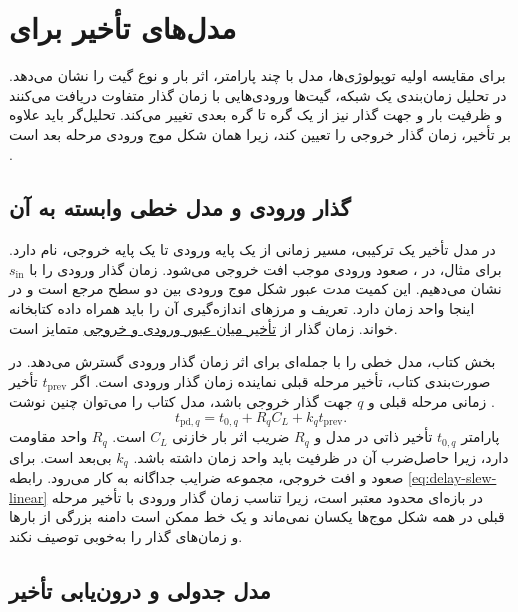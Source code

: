 \section{مدل‌های تأخیر برای }
\label{sec:delay-timing-models}

برای مقایسه اولیه توپولوژی‌ها، مدل 
با چند پارامتر، اثر بار و نوع گیت را نشان می‌دهد. در تحلیل
زمان‌بندی یک شبکه، گیت‌ها ورودی‌هایی با زمان گذار متفاوت
دریافت می‌کنند و ظرفیت بار و جهت گذار نیز از یک گره تا گره
بعدی تغییر می‌کند. تحلیل‌گر باید علاوه بر تأخیر، زمان گذار
خروجی را تعیین کند، زیرا همان شکل موج ورودی مرحله بعد است
\cite[بخش ، صفحات ۱۷۳ و ۱۷۴]{weste}.

\subsection{گذار ورودی و مدل خطی وابسته به آن}
\label{sec:delay-slew-linear}

در مدل تأخیر یک  ترکیبی، مسیر زمانی از یک پایه ورودی
تا یک پایه خروجی،  نام دارد. برای مثال، در
، صعود ورودی موجب افت خروجی می‌شود. زمان گذار
ورودی را با \(s_{\mathrm{in}}\) نشان می‌دهیم. این کمیت
مدت عبور شکل موج ورودی بین دو سطح مرجع است و در اینجا واحد
زمان دارد. تعریف و مرزهای اندازه‌گیری آن را باید همراه داده
کتابخانه خواند. زمان گذار از
\hyperref[sec:delay-waveform]{تأخیر میان عبور ورودی و خروجی}
متمایز است.

بخش  کتاب، مدل خطی را با جمله‌ای برای اثر
زمان گذار ورودی گسترش می‌دهد. در صورت‌بندی کتاب، تأخیر مرحله
قبلی نماینده زمان گذار ورودی است. اگر \(t_{\mathrm{prev}}\)
تأخیر زمانی مرحله قبلی و \(q\) جهت گذار خروجی باشد،
مدل کتاب را می‌توان چنین نوشت
\cite[بخش ، صفحه ۱۷۳]{weste}.
\begin{equation}
  t_{\mathrm{pd},q}=t_{0,q}+R_q C_L+k_qt_{\mathrm{prev}}.
  \label{eq:delay-slew-linear}
\end{equation}
پارامتر \(t_{0,q}\) تأخیر ذاتی در مدل و \(R_q\) ضریب اثر
بار خازنی \(C_L\) است. \(R_q\) واحد مقاومت دارد، زیرا
حاصل‌ضرب آن در ظرفیت باید واحد زمان داشته باشد. \(k_q\) بی‌بعد
است. برای صعود و افت خروجی، مجموعه ضرایب جداگانه به کار
می‌رود. رابطه \eqref{eq:delay-slew-linear} در بازه‌ای محدود
معتبر است، زیرا
تناسب زمان گذار ورودی با تأخیر مرحله قبلی در همه شکل موج‌ها
یکسان نمی‌ماند و یک خط ممکن است دامنه بزرگی از بارها و
زمان‌های گذار را به‌خوبی توصیف نکند.

\subsection{مدل جدولی و درون‌یابی تأخیر}
\label{sec:delay-nldm}

